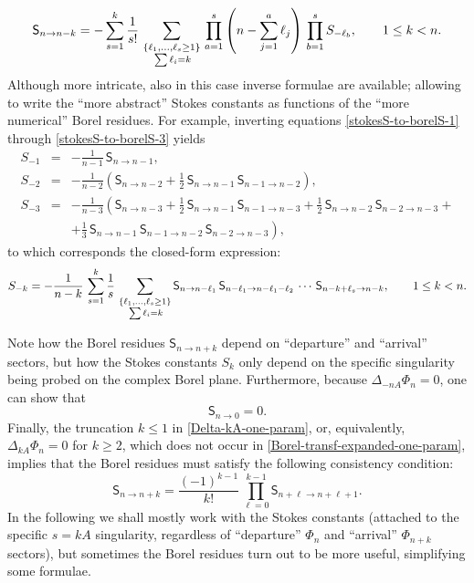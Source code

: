 \documentclass[11pt,a4paper]{article}
\newcommand{\be}{\begin{equation}}
\newcommand{\ee}{\end{equation}}
\newcommand{\bea}{\begin{eqnarray}}
\newcommand{\eea}{\end{eqnarray}}
\begin{document}
%
\be
\label{stokesS-to-borelS-GEN}
\mathsf{S}_{n\to n-k} = - \sum_{s=1}^{k} \frac{1}{s!}\, \sum_{\substack{\left\{ \ell_1,\ldots,\ell_s\ge 1 \right\} \\ \vphantom{\frac{1}{2}} \sum \ell_i=k}}\, \prod_{a=1}^{s} \left( n - \sum_{j=1}^{a} \ell_j \right)\, \prod_{b=1}^{s} S_{-\ell_b}, \qquad  1\le k < n.
\ee
%
\noindent
Although more intricate, also in this case inverse formulae are available; allowing to write the ``more abstract'' Stokes constants as functions of the ``more numerical'' Borel residues. For example, inverting equations \eqref{stokesS-to-borelS-1} through \eqref{stokesS-to-borelS-3} yields
%
\bea
\label{borelS-to-stokesS-1}
S_{-1} &=& - \frac{1}{n-1}\, \mathsf{S}_{n\to n-1}, \\
\label{borelS-to-stokesS-2}
S_{-2} &=& - \frac{1}{n-2} \left( \mathsf{S}_{n\to n-2} + \frac{1}{2}\, \mathsf{S}_{n\to n-1}\, \mathsf{S}_{n-1\to n-2} \right), \\
\label{borelS-to-stokesS-3}
S_{-3} &=& - \frac{1}{n-3} \left( \mathsf{S}_{n\to n-3} + \frac{1}{2}\, \mathsf{S}_{n\to n-1}\, \mathsf{S}_{n-1\to n-3} + \frac{1}{2}\, \mathsf{S}_{n\to n-2}\, \mathsf{S}_{n-2\to n-3} + \right. \nonumber \\
&&
\left. + \frac{1}{3}\, \mathsf{S}_{n\to n-1}\, \mathsf{S}_{n-1\to n-2}\, \mathsf{S}_{n-2\to n-3} \right),
\eea
%
\noindent
to which corresponds the closed-form expression:
%
\be
\label{borelS-to-stokesS-GEN}
S_{-k} = - \frac{1}{n-k}\, \sum_{s=1}^{k} \frac{1}{s}\, \sum_{\substack{\left\{ \ell_1,\ldots,\ell_s\ge 1 \right\} \\ \vphantom{\frac{1}{2}} \sum \ell_i=k}} \mathsf{S}_{n\to n-\ell_1}\, \mathsf{S}_{n-\ell_1\to n-\ell_1-\ell_2}\, \cdots\, \mathsf{S}_{n-k+\ell_s\to n-k}, \qquad 1\le k < n.
\ee

Note how the Borel residues $\mathsf{S}_{n\to n+k}$ depend on ``departure'' and ``arrival'' sectors, but how the Stokes constants $S_k$ only depend on the specific singularity being probed on the complex Borel plane. Furthermore, because $\Delta_{-n A} \Phi_n = 0$, one can show that
%
\be
\mathsf{S}_{n\to 0} = 0.
\ee
%
\noindent
Finally, the truncation $k \le 1$ in \eqref{Delta-kA-one-param}, or, equivalently, $\Delta_{k A} \Phi_n = 0$ for $k \ge 2$, which does not occur in \eqref{Borel-transf-expanded-one-param}, implies that the Borel residues must satisfy the following consistency condition:
%
\be
\label{borelS-consistency}
\mathsf{S}_{n\to n+k} = \frac{(-1)^{k-1}}{k!}\, \prod_{\ell=0}^{k-1} \mathsf{S}_{n+\ell\to n+\ell+1}.
\ee
%
\noindent
In the following we shall mostly work with the Stokes constants (attached to the specific $s = kA$ singularity, regardless of ``departure'' $\Phi_n$ and ``arrival'' $\Phi_{n+k}$ sectors), but sometimes the Borel residues turn out to be more useful, simplifying some formulae.
\end{document}
